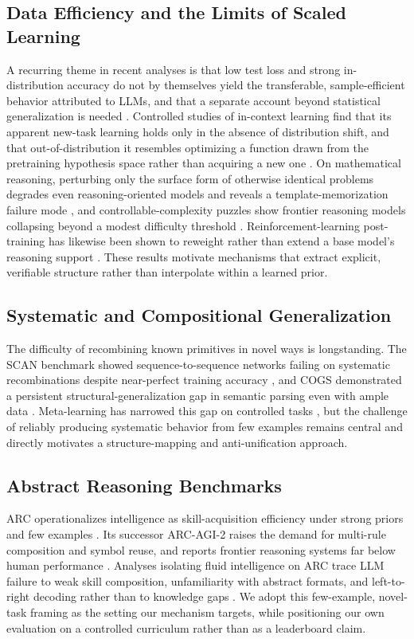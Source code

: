 \documentclass[letterpaper]{article} %
\begin{document}
\subsection{Data Efficiency and the Limits of Scaled Learning}
A recurring theme in recent analyses is that low test loss and strong
in-distribution accuracy do not by themselves yield the transferable,
sample-efficient behavior attributed to LLMs, and that a separate account beyond
statistical generalization is needed \cite{reizinger2024position}. Controlled
studies of in-context learning find that its apparent new-task learning holds
only in the absence of distribution shift, and that out-of-distribution it
resembles optimizing a function drawn from the pretraining hypothesis space
rather than acquiring a new one \cite{wang2025icl}. On mathematical reasoning,
perturbing only the surface form of otherwise identical problems degrades
even reasoning-oriented models and reveals a template-memorization failure mode
\cite{mirzadeh2025gsm}, and controllable-complexity puzzles show frontier
reasoning models collapsing beyond a modest difficulty threshold
\cite{shojaee2025illusion}. Reinforcement-learning post-training has likewise
been shown to reweight rather than extend a base model's reasoning support
\cite{yue2025rl}. These results motivate mechanisms that extract explicit,
verifiable structure rather than interpolate within a learned prior.

\subsection{Systematic and Compositional Generalization}
The difficulty of recombining known primitives in novel ways is longstanding.
The SCAN benchmark showed sequence-to-sequence networks failing on systematic
recombinations despite near-perfect training accuracy \cite{lakebaroni2018scan},
and COGS demonstrated a persistent structural-generalization gap in semantic
parsing even with ample data \cite{kim2020cogs}. Meta-learning has narrowed this
gap on controlled tasks \cite{lakebaroni2023}, but the challenge of reliably
producing systematic behavior from few examples remains central and directly
motivates a structure-mapping and anti-unification approach.

\subsection{Abstract Reasoning Benchmarks}
ARC operationalizes intelligence as skill-acquisition efficiency under strong
priors and few examples \cite{chollet2019measure}. Its successor ARC-AGI-2
raises the demand for multi-rule composition and symbol reuse, and reports
frontier reasoning systems far below human performance
\cite{chollet2025arcagi2,arcprize2025}. Analyses isolating fluid intelligence on
ARC trace LLM failure to weak skill composition, unfamiliarity with abstract
formats, and left-to-right decoding rather than to knowledge gaps
\cite{wu2025fluid}. We adopt this few-example, novel-task framing as the setting
our mechanism targets, while positioning our own evaluation on a controlled
curriculum rather than as a leaderboard claim.
\end{document}
